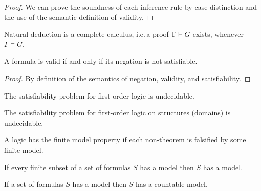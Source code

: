 \begin{proof}
	We can prove the soundness of each inference rule by case distinction and the use of the semantic definition of validity.
\end{proof}



\begin{theorem}
	Natural deduction is a complete calculus,
	i.e.\,a proof \( \Gamma\vdash G \) exists,
	whenever \( \Gamma\models G \).
\end{theorem}




\begin{lemma}[Refutation]
	A formula is valid if and only if its negation is not satisfiable.
\end{lemma}
\begin{proof}
By definition of the semantics of negation, validity, and satisfiability.
\end{proof}

\begin{theorem}
	The satisfiability problem for first-order logic is undecidable.
\end{theorem}

\begin{theorem}
	The satisfiability problem for first-order logic on  structures (domains) is undecidable.
\end{theorem}

\begin{definition}
	A logic has the finite model property if each non-theorem is falsified by some finite model.
\end{definition}

\begin{theorem}\label{the:compactness}
	If every finite subset of a set of formulas \( S \) has a model then \( S \) has a model.
\end{theorem}

\begin{theorem}\label{the:loewenheim}
	If a set of formulas \( S \) has a model then \( S \) has a countable model.
\end{theorem}

